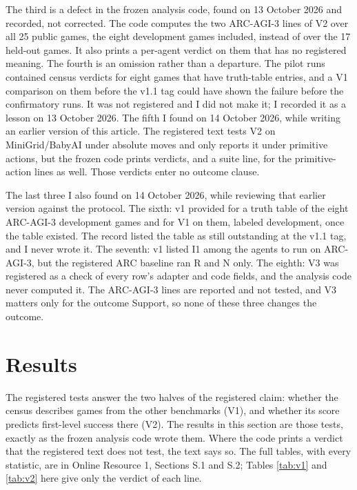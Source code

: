 \documentclass[twocolumn]{svjour3}
\begin{document}
The third is a defect in the frozen analysis code, found on 13 October
2026 and recorded, not corrected. The code computes the two ARC-AGI-3
lines of V2 over all 25 public games, the eight development games
included, instead of over the 17 held-out games. It also prints a
per-agent verdict on them that has no registered meaning. The fourth is
an omission rather than a departure. The pilot runs contained census
verdicts for eight games that have truth-table entries, and a V1
comparison on them before the v1.1 tag could have shown the failure
before the confirmatory runs. It was not registered and I did not make
it; I recorded it as a lesson on 13 October 2026. The fifth I found on
14 October 2026, while writing an earlier version of this article. The
registered text tests V2 on MiniGrid/BabyAI under absolute moves and
only reports it under primitive actions, but the frozen code prints
verdicts, and a suite line, for the primitive-action lines as well.
Those verdicts enter no outcome clause.

The last three I also found on 14 October 2026, while reviewing that
earlier version against the protocol. The sixth: v1 provided for a truth
table of the eight ARC-AGI-3 development games and for V1 on them,
labeled development, once the table existed. The record listed the table
as still outstanding at the v1.1 tag, and I never wrote it. The seventh:
v1 listed I1 among the agents to run on ARC-AGI-3, but the registered
ARC baseline ran R and N only. The eighth: V3 was registered as a check
of every row's adapter and code fields, and the analysis code never
computed it. The ARC-AGI-3 lines are reported and not tested, and V3
matters only for the outcome Support, so none of these three changes the
outcome.

\section{Results}\label{sec:results}

The registered tests answer the two halves of the registered claim:
whether the census describes games from the other benchmarks (V1), and
whether its score predicts first-level success there (V2). The results
in this section are those tests, exactly as the frozen analysis code
wrote them. Where the code prints a verdict that the registered text
does not test, the text says so. The full tables, with every statistic,
are in Online Resource 1, Sections S.1 and S.2; Tables \ref{tab:v1} and
\ref{tab:v2} here give only the verdict of each line.
\end{document}
